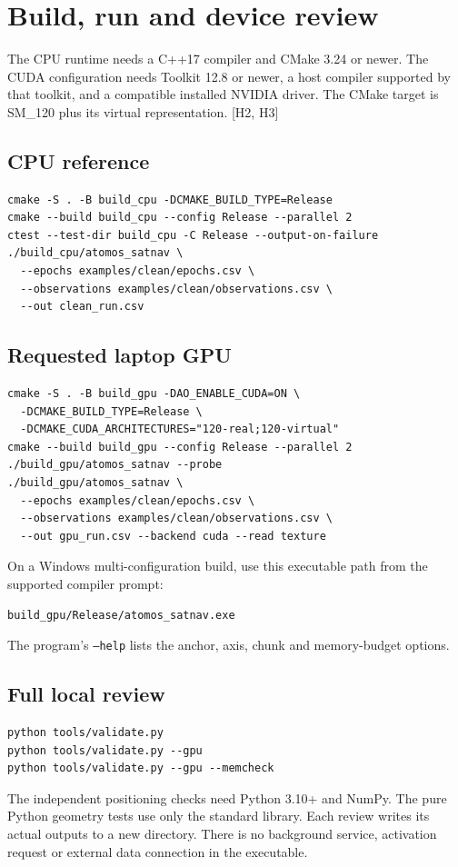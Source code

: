 \documentclass[11pt,a4paper]{article}
\newcommand{\code}[1]{\texttt{#1}}
\begin{document}
\section{Build, run and device review}
The CPU runtime needs a C++17 compiler and CMake 3.24 or newer. The CUDA configuration needs Toolkit
12.8 or newer, a host compiler supported by that toolkit, and a compatible installed NVIDIA driver. The
CMake target is SM\_120 plus its virtual representation. [H2, H3]

\subsection{CPU reference}
\begin{lstlisting}
cmake -S . -B build_cpu -DCMAKE_BUILD_TYPE=Release
cmake --build build_cpu --config Release --parallel 2
ctest --test-dir build_cpu -C Release --output-on-failure
./build_cpu/atomos_satnav \
  --epochs examples/clean/epochs.csv \
  --observations examples/clean/observations.csv \
  --out clean_run.csv
\end{lstlisting}
\subsection{Requested laptop GPU}
\begin{lstlisting}
cmake -S . -B build_gpu -DAO_ENABLE_CUDA=ON \
  -DCMAKE_BUILD_TYPE=Release \
  -DCMAKE_CUDA_ARCHITECTURES="120-real;120-virtual"
cmake --build build_gpu --config Release --parallel 2
./build_gpu/atomos_satnav --probe
./build_gpu/atomos_satnav \
  --epochs examples/clean/epochs.csv \
  --observations examples/clean/observations.csv \
  --out gpu_run.csv --backend cuda --read texture
\end{lstlisting}
On a Windows multi-configuration build, use this executable path from the supported compiler prompt:
\begin{lstlisting}
build_gpu/Release/atomos_satnav.exe
\end{lstlisting}
The program's \code{--help} lists the anchor, axis, chunk and memory-budget options.

\subsection{Full local review}
\begin{lstlisting}
python tools/validate.py
python tools/validate.py --gpu
python tools/validate.py --gpu --memcheck
\end{lstlisting}
The independent positioning checks need Python 3.10+ and NumPy. The pure Python geometry tests use only
the standard library. Each review writes its actual outputs to a new directory. There is no background
service, activation request or external data connection in the executable.
\clearpage
\end{document}
